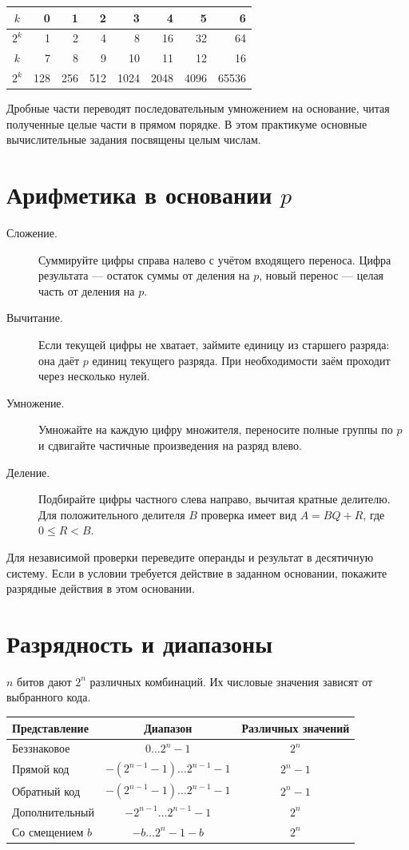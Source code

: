 \begin{center}
\begin{tabular}{c|rrrrrrr}
$k$ & 0 & 1 & 2 & 3 & 4 & 5 & 6\\\hline
$2^k$ & 1 & 2 & 4 & 8 & 16 & 32 & 64\\[2pt]
$k$ & 7 & 8 & 9 & 10 & 11 & 12 & 16\\\hline
$2^k$ & 128 & 256 & 512 & 1024 & 2048 & 4096 & 65536
\end{tabular}
\end{center}

Дробные части переводят последовательным умножением на основание, читая полученные целые части в прямом порядке. В этом практикуме основные вычислительные задания посвящены целым числам.

\section{Арифметика в основании \texorpdfstring{$p$}{p}}
\begin{description}
    \item[Сложение.] Суммируйте цифры справа налево с учётом входящего переноса. Цифра результата --- остаток суммы от деления на $p$, новый перенос --- целая часть от деления на $p$.
    \item[Вычитание.] Если текущей цифры не хватает, займите единицу из старшего разряда: она даёт $p$ единиц текущего разряда. При необходимости заём проходит через несколько нулей.
    \item[Умножение.] Умножайте на каждую цифру множителя, переносите полные группы по $p$ и сдвигайте частичные произведения на разряд влево.
    \item[Деление.] Подбирайте цифры частного слева направо, вычитая кратные делителю. Для положительного делителя $B$ проверка имеет вид $A=BQ+R$, где $0\le R<B$.
\end{description}
Для независимой проверки переведите операнды и результат в десятичную систему. Если в условии требуется действие в заданном основании, покажите разрядные действия в этом основании.

\section{Разрядность и диапазоны}
$n$ битов дают $2^n$ различных комбинаций. Их числовые значения зависят от выбранного кода.

\begin{center}
\small
\begin{tabular}{l|c|c}
Представление & Диапазон & Различных значений\\\hline
Беззнаковое & $0\ldots 2^n-1$ & $2^n$\\
Прямой код & $-(2^{n-1}-1)\ldots 2^{n-1}-1$ & $2^n-1$\\
Обратный код & $-(2^{n-1}-1)\ldots 2^{n-1}-1$ & $2^n-1$\\
Дополнительный & $-2^{n-1}\ldots 2^{n-1}-1$ & $2^n$\\
Со смещением $b$ & $-b\ldots 2^n-1-b$ & $2^n$
\end{tabular}
\end{center}

